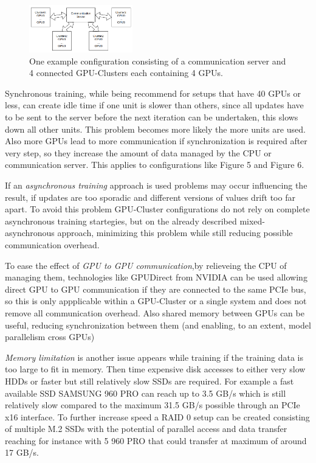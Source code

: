 \documentclass[conference]{IEEEtran}
\begin{document}
\begin{figure}
\centering
\includegraphics[width=0.4\textwidth]{cluster_setup.png}
\caption{One example configuration consisting of a communication server and 4 connected GPU-Clusters each containing 4 GPUs.}
\end{figure}
Synchronous training, while being recommend for setups that have 40 GPUs or less, can create idle time if one unit is slower than others, since all updates have to be sent to the server before the next iteration can be undertaken, this slows down all other units. This problem becomes more likely the more units are used. Also more GPUs lead to more communication if synchronization is required after very step, so they increase the amount of data managed by the CPU or communication server. This applies to configurations like Figure 5 and Figure 6.

If an \emph{asynchronous training} approach is used problems may occur influencing the result, if updates are too sporadic and different versions of values drift too far apart. To avoid this problem GPU-Cluster configurations do not rely on complete asynchronous training startegies, but on the already described mixed-asynchronous approach, minimizing this problem while still reducing possible communication overhead.

To ease the effect of \emph{GPU to GPU communication},by relieveing the CPU of managing them, technologies like GPUDirect from NVIDIA\cite{nvidiagpudirect2017} can be used allowing direct GPU to GPU communication if they are connected to the same PCIe bus, so this is only appplicable within a GPU-Cluster or a single system and does not remove all communication overhead. Also shared memory between GPUs can be useful, reducing synchronization between them (and enabling, to an extent, model parallelism cross GPUs)

\emph{Memory limitation} is another issue appears while training if the training data is too large to fit in memory. Then time expensive disk accesses to either very slow HDDs or faster but still relatively slow SSDs are required. For example a fast available SSD SAMSUNG 960 PRO can reach up to 3.5 GB/s which is still relatively slow compared to the maximum 31.5 GB/s possible through an PCIe x16 interface. To further increase speed a RAID 0 setup can be created consisting of multiple M.2 SSDs with the potential of parallel access and data transfer reaching for instance with 5 960 PRO that could transfer at maximum of around 17 GB/s.
\end{document}

